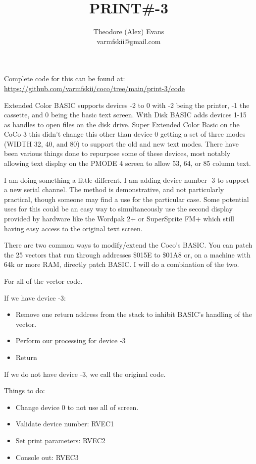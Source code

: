\documentclass{article}
\title{PRINT\#-3}
\author{Theodore (Alex) Evans\\varmfskii@gmail.com}
\begin{document}
\maketitle

Complete code for this can be found at: \url{https://github.com/varmfskii/coco/tree/main/print-3/code}

Extended Color BASIC supports devices -2 to 0 with -2 being the
printer, -1 the cassette, and 0 being the basic text screen. With Disk
BASIC adds devices 1-15 as handles to open files on the disk
drive. Super Extended Color Basic on the CoCo 3 this didn't change
this other than device 0 getting a set of three modes (WIDTH 32, 40,
and 80) to support the old and new text modes. There have been various
things done to repurpose some of these devices, most notably allowing
text display on the PMODE 4 screen to allow 53, 64, or 85 column text.

I am doing something a little different. I am adding device number -3
to support a new serial channel. The method is demonstrative, and not
particularly practical, though someone may find a use for the
particular case. Some potential uses for this could be an easy way to
simultaneously use the second display provided by hardware like the
Wordpak 2+ or SuperSprite FM+ which still having easy access to the
original text screen.

There are two common ways to modify/extend the Coco's BASIC. You can
patch the 25 vectors that run through addresses \$015E to \$01A8 or,
on a machine with 64k or more RAM, directly patch BASIC. I will do a
combination of the two.

For all of the vector code.

If we have device -3:

\begin{itemize}
\item Remove one return address from the stack to inhibit BASIC's
  handling of the vector.
\item Perform our processing for device -3
\item Return
\end{itemize}

If we do not have device -3, we call the original code.

Things to do:
\begin{itemize}
\item Change device 0 to not use all of screen.
\item Validate device number:  RVEC1
\item Set print parameters: RVEC2
\item Console out: RVEC3
\end{itemize}
\end{document}
